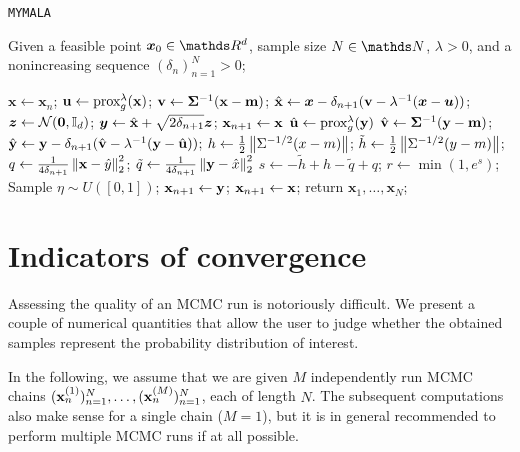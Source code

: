 \documentclass[10pt]{article}
\numberwithin{equation}{section}
\begin{document}
\begin{algorithm}[H]
\caption{\texttt{MYMALA}}
Given a feasible point $\bm x_0 \in \R^d$, sample size $N \in \N$, $\lambda > 0$, and a nonincreasing sequence $(\delta_n)_{n=1}^N > 0$;
\begin{algorithmic}[2]\label{alg:mymala}
\State $\bm x \gets \bm x_n$;
\State $\mathbf{u} \gets \text{prox}_{g}^{\lambda}(\mathbf{x})$;
\State $\mathbf{v} \gets \mathbf{\Sigma}^{-1}(\mathbf{x} - \mathbf{m})$;
\State $\hat{\mathbf{x}} \gets \bm x - \delta_{n+1} (\mathbf{v} - \lambda^{-1}(\bm x - \bm u))$;
\State $\bm z \gets \mathcal{N}(\bm 0, \mathbb{I}_d)$;
\State $\bm y \gets \hat{\mathbf{x}} + \sqrt{2 \delta_{n+1}} \bm z$;
\State $\mathbf{x}_{n+1} \gets \mathbf{x}$
\Else
\State $\hat{\mathbf{u}} \gets \text{prox}_{g}^{\lambda}(\mathbf{y})$
\State $\hat{\mathbf{v}} \gets \mathbf{\Sigma}^{-1}(\mathbf{y} - \mathbf{m})$;
\State $\hat{\mathbf{y}} \gets \mathbf{y} - \delta_{n+1} (\hat{\mathbf{v}} - \lambda^{-1}(\mathbf{y} - \hat{\mathbf{u}}))$;
\State $h \gets \frac{1}{2}\left\|\Sigma^{-1/2}(x-m)\right\|$;
\State $\tilde h \gets \frac{1}{2} \left\|\Sigma^{-1/2}(y-m)\right\|$;
\State $q \gets \frac{1}{4 \delta_{n+1}} \left\|\mathbf{x} - \hat y\right\|_2^2$;
\State $\tilde q \gets \frac{1}{4 \delta_{n+1}} \left\|\mathbf{y} - \hat x\right\|_2^2$
\State $s \gets - \tilde h + h - \tilde q + q$;
\State $r \gets \min(1, e^s)$;
\State Sample $\eta \sim U([0,1])$;
\State $\mathbf{x}_{n+1} \gets \mathbf{y}$;
\Else
\State $\mathbf{x}_{n+1} \gets \mathbf{x}$;
\EndIf
\EndIf
\EndFor
\State return $\bm x_1, \ldots, \bm x_N$;
\end{algorithmic}
\end{algorithm}



\section{Indicators of convergence}

Assessing the quality of an MCMC run is notoriously difficult. We present a couple of numerical quantities that allow the user to judge whether the obtained samples represent the probability distribution of interest.

In the following, we assume that we are given $M$ independently run MCMC chains $(\mathbf{x}_n^{(1)})_{n=1}^N, \ldots, (\mathbf{x}_n^{(M)})_{n=1}^N$, each of length $N$. The subsequent computations also make sense for a single chain ($M=1$), but it is in general recommended to perform multiple MCMC runs if at all possible.
\end{document}
